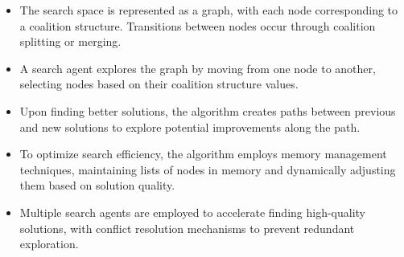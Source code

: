 \begin{itemize}
    \item The search space is represented as a graph, with each node corresponding to a coalition structure. Transitions between nodes occur through coalition splitting or merging.
    \item A search agent explores the graph by moving from one node to another, selecting nodes based on their coalition structure values.
    \item Upon finding better solutions, the algorithm creates paths between previous and new solutions to explore potential improvements along the path.
    \item To optimize search efficiency, the algorithm employs memory management techniques, maintaining lists of nodes in memory and dynamically adjusting them based on solution quality.
    \item Multiple search agents are employed to accelerate finding high-quality solutions, with conflict resolution mechanisms to prevent redundant exploration.
\end{itemize}